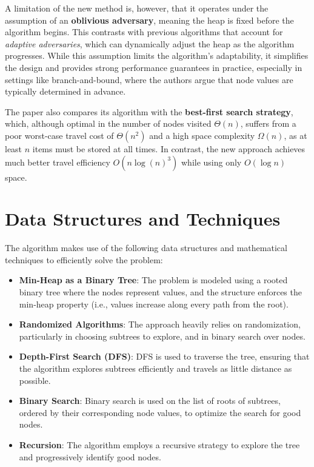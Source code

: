 \documentclass{article}
\begin{document}
A limitation of the new method is, however, that it operates under the assumption of an \textbf{oblivious adversary}, meaning the heap is fixed before the algorithm begins. This contrasts with previous algorithms that account for \textit{adaptive adversaries}, which can dynamically adjust the heap as the algorithm progresses. While this assumption limits the algorithm's adaptability, it simplifies the design and provides strong performance guarantees in practice, especially in settings like branch-and-bound, where the authors argue that node values are typically determined in advance.

The paper also compares its algorithm with the \textbf{best-first search strategy}, which, although optimal in the number of nodes visited $\Theta(n)$, suffers from a poor worst-case travel cost of $\Theta(n^2)$ and a high space complexity $\Omega(n)$, as at least $n$ items must be stored at all times. In contrast, the new approach achieves much better travel efficiency $O(n \log(n)^3)$ while using only $O(\log n)$ space. 


\section{Data Structures and Techniques}
The algorithm makes use of the following data structures and mathematical techniques to efficiently solve the problem:

\begin{itemize}
    \item \textbf{Min-Heap as a Binary Tree}: The problem is modeled using a rooted binary tree where the nodes represent values, and the structure enforces the min-heap property (i.e., values increase along every path from the root).
    \item \textbf{Randomized Algorithms}: The approach heavily relies on randomization, particularly in choosing subtrees to explore, and in binary search over nodes.
    \item \textbf{Depth-First Search (DFS)}: DFS is used to traverse the tree, ensuring that the algorithm explores subtrees efficiently and travels as little distance as possible.
    \item \textbf{Binary Search}: Binary search is used on the list of roots of subtrees, ordered by their corresponding node values, to optimize the search for good nodes.
    \item \textbf{Recursion}: The algorithm employs a recursive strategy to explore the tree and progressively identify good nodes.
\end{itemize}
\end{document}
